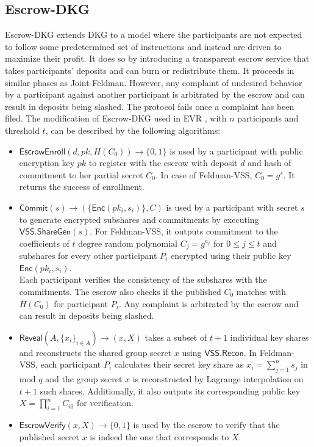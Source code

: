 \documentclass[letterpaper,twocolumn,10pt]{article}
\theoremstyle{definition}
\theoremstyle{remark}
\begin{document}
\subsection{Escrow-DKG}
\label{appendix:edkg}
Escrow-DKG \cite{david2019rational} extends DKG to a model where the participants are not expected to follow some predetermined set of instructions and instead are driven to maximize their profit. It does so by introducing a transparent escrow service that takes participants' deposits and can burn or redistribute them. It proceeds in similar phases as Joint-Feldman. However, any complaint of undesired behavior by a participant against another participant is arbitrated by the escrow and can result in deposits being slashed. The protocol fails once a complaint has been filed. The modification of Escrow-DKG used in EVR , with $n$ participants and threshold $t$, can be described by the following algorithms:
\begin{itemize}
    \item $\mathsf{EscrowEnroll}(d, pk, H(C_{0})) \rightarrow \{0,1\}$ is used by a participant with public encryption key $pk$ to register with the escrow with deposit $d$ and hash of commitment to her partial secret $C_{0}$. In case of Feldman-VSS, $C_{0} = g^{s}$. It returns the success of enrollment.
    
    \item $\mathsf{Commit} (s) \rightarrow (\{\mathsf{Enc}(pk_i, s_{i})\}, C)$ is used by a participant with secret $s$ to generate encrypted subshares and commitments by executing $\mathsf{VSS.ShareGen}(s)$. For Feldman-VSS, it outputs commitment to the coefficients of $t$ degree random polynomial $C_j = g^{a_j}$ for $0\le j \le t$ and subshares for every other participant $P_i$ encrypted using their public key $\mathsf{Enc}(pk_i, s_{i})$. \\
    Each participant verifies the consistency of the subshares with the commitments. The escrow also checks if the published $C_{0}$ matches with $H(C_{0})$ for participant $P_i$. Any complaint is arbitrated by the escrow and can result in deposits being slashed.
    
    \item $\mathsf{Reveal}(A, \{x_i\}_{i \in A}) \rightarrow (x, X)$ takes a subset of $t+1$ individual key shares and reconstructs the shared group secret $x$ using $\mathsf{VSS.Recon}$. In Feldman-VSS, each participant $P_i$ calculates their secret key share as $x_i = \sum_{j=1}^{n} s_j$ in mod $q$ and the group secret $x$ is reconstructed by Lagrange interpolation on $t+1$ such shares. Additionally, it also outputs its corresponding public key $X = \prod_{i=1}^{n} C_{i0}$ for verification.
    
    \item $\mathsf{EscrowVerify}(x, X)\rightarrow\{0,1\}$ is used by the escrow to verify that the published secret $x$ is indeed the one that corresponds to $X$.
\end{itemize}
\end{document}
